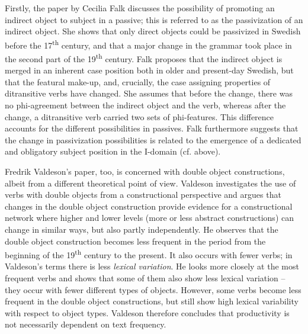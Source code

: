 \documentclass[output=paper]{langscibook}
\begin{document}
Firstly, the paper by Cecilia Falk discusses the possibility of promoting an indirect object to subject in a passive; this is referred to as the passivization of an indirect object. She shows that only direct objects could be passivized in Swedish before the 17\textsuperscript{th} century, and that a major change in the grammar took place in the second part of the 19\textsuperscript{th} century. Falk proposes that the indirect object is merged in an inherent case position both in older and present-day Swedish, but that the featural make-up, and, crucially, the case assigning properties of ditransitive verbs have changed. She assumes that before the change, there was no phi-agreement between the indirect object and the verb, whereas after the change, a ditransitive verb carried two sets of phi-features. This difference accounts for the different possibilities in passives. Falk furthermore suggests that the change in passivization possibilities is related to the emergence of a dedicated and obligatory subject position in the I-domain (cf.  above).



Fredrik Valdeson’s paper, too, is concerned with double object constructions, albeit from a different theoretical point of view. Valdeson investigates the use of verbs with double objects from a constructional perspective and argues that changes in the double object construction provide evidence for a constructional network where higher and lower levels (more or less abstract constructions) can change in similar ways, but also partly independently. He observes that the double object construction becomes less frequent in the period from the beginning of the 19\textsuperscript{th} century to the present. It also occurs with fewer verbs; in Valdeson’s terms there is less \textit{lexical variation}. He looks more closely at the most frequent verbs and shows that some of them also show less lexical variation – they occur with fewer different types of objects. However, some verbs become less frequent in the double object constructions, but still show high lexical variability with respect to object types. Valdeson therefore concludes that productivity is not necessarily dependent on text frequency.
\end{document}
